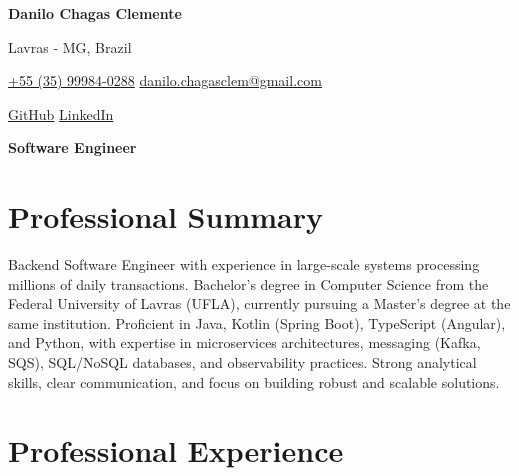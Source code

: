 \documentclass[a4paper,10pt]{article}
\begin{document}

\noindent
\begin{minipage}[t]{0.5\textwidth}
\textbf{\Large Danilo Chagas Clemente}

\vspace{0.4em}

\end{minipage}%
\begin{minipage}[t]{0.5\textwidth}
\raggedleft

Lavras - MG, Brazil

{\color{blue}} \href{tel:+5535999840288}{\faPhone \space +55 (35) 99984-0288}
{\color{blue}} \href{mailto:danilo.chagasclem@gmail.com}{\faEnvelope \space danilo.chagasclem@gmail.com}

\vspace{0.2em}
 \quad
{\color{blue}} \href{https://github.com/danilochagasc}{\faGithub \space GitHub} \quad
{\color{blue}} \href{https://www.linkedin.com/in/danilo-clemente-94880a232/}{\faLinkedin \space LinkedIn} \\
\end{minipage}

\vspace{1em}

\noindent\textbf{\Large Software Engineer}
\vspace{0.5em}

\section*{Professional Summary}

\vspace{0.6em}

Backend Software Engineer with experience in large-scale systems processing millions of daily transactions. Bachelor's degree in Computer Science from the Federal University of Lavras (UFLA), currently pursuing a Master's degree at the same institution. Proficient in Java, Kotlin (Spring Boot), TypeScript (Angular), and Python, with expertise in microservices architectures, messaging (Kafka, SQS), SQL/NoSQL databases, and observability practices. Strong analytical skills, clear communication, and focus on building robust and scalable solutions.

\vspace{0.6em}

\section*{Professional Experience}
\end{document}
